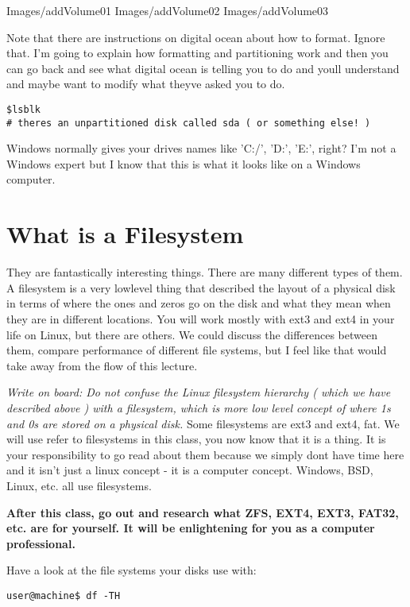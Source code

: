 \documentclass[10pt]{article}
\begin{document}
Images/addVolume01
Images/addVolume02
Images/addVolume03

Note that there are instructions on digital ocean about how to format. Ignore
that. I'm going to explain how formatting and partitioning work and then you can
go back and see what digital ocean is telling you to do and youll understand and
maybe want to modify what theyve asked you to do.

\begin{lstlisting}
$lsblk
# theres an unpartitioned disk called sda ( or something else! )
\end{lstlisting}

Windows normally gives your drives names like 'C:/', 'D:', 'E:', right? I'm not
a Windows expert but I know that this is what it looks like on a Windows
computer.


\section{What is a Filesystem} 
They are fantastically interesting things. There
are many different types of them. A filesystem is a very lowlevel thing that
described the layout of a physical disk in terms of where the ones and zeros go
on the disk and what they mean when they are in different locations. You will
work mostly with ext3 and ext4 in your life on Linux, but there are others. We
could discuss the differences between them, compare performance of different
file systems, but I feel like that would take away from the flow of this
lecture. 

{\LARGE\textit{Write on board: Do not confuse the Linux filesystem hierarchy (
which we have described above ) with a filesystem, which is more low level
concept of where 1s and 0s are stored on a physical disk.} Some filesystems are
ext3 and ext4, fat. We will use refer to filesystems in this class, you now know
that it is a thing. It is your responsibility to go read about them because we
simply dont have time here and it isn't just a linux concept - it is a computer
concept. Windows, BSD, Linux, etc. all use filesystems.}

\begin{center}
\textbf{After this class, go out and research what ZFS, EXT4,
EXT3, FAT32, etc. are for yourself. It will be enlightening for you as a
computer professional.}
\end{center}

Have a look at the file systems your disks use with:

\begin{lstlisting}
user@machine$ df -TH
\end{lstlisting}
\end{document}
